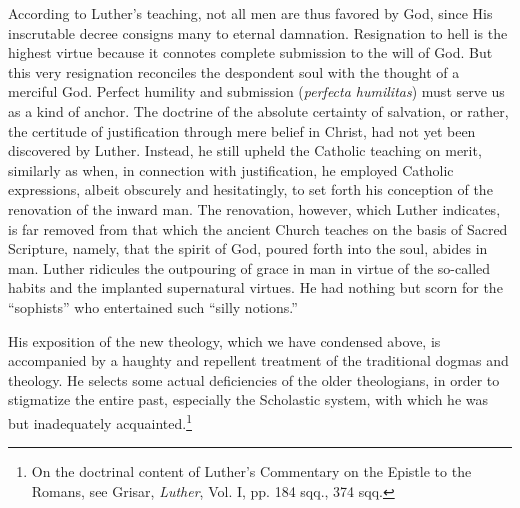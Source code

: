 According to Luther’s teaching, not all men are thus favored by
God, since His inscrutable decree consigns many to eternal damnation.
Resignation to hell is the highest virtue because it connotes
complete submission to the will of God. But this very resignation
reconciles the despondent soul with the thought of a merciful God.
Perfect humility and submission (\textit{perfecta humilitas}) must serve us
as a kind of anchor. The doctrine of the absolute certainty of salvation,
or rather, the certitude of justification through mere belief
in Christ, had not yet been discovered by Luther. Instead, he still
upheld the Catholic teaching on merit, similarly as when, in connection
with justification, he employed Catholic expressions, albeit
obscurely and hesitatingly, to set forth his conception of the renovation
of the inward man. The renovation, however, which Luther
indicates, is far removed from that which the ancient Church teaches
on the basis of Sacred Scripture, namely, that the spirit of God,
poured forth into the soul, abides in man. Luther ridicules the outpouring
of grace in man in virtue of the so-called habits and the implanted
supernatural virtues. He had nothing but scorn for the
“sophists” who entertained such “silly notions.”

His exposition of the new theology, which we have condensed
above, is accompanied by a haughty and repellent treatment of the
traditional dogmas and theology. He selects some actual deficiencies
of the older theologians, in order to stigmatize the entire past, especially
the Scholastic system, with which he was but inadequately acquainted.\footnote
{On the doctrinal content of Luther's Commentary on the Epistle to the Romans, see
Grisar, \textit{Luther}, Vol. I, pp. 184 sqq., 374 sqq.}

